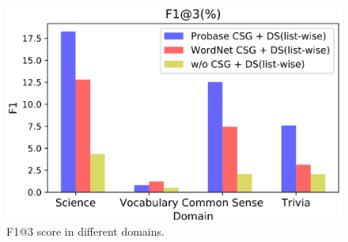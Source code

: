 \begin{figure}[ht]
		\centering
		\includegraphics[width=1\columnwidth]{figure/f1.eps}
		\caption{F1@3 score in different domains.}
		\label{fig:domains}
\end{figure}

%
